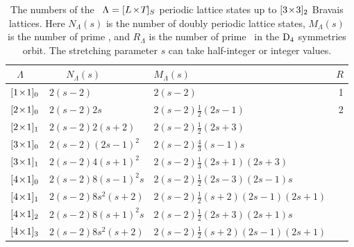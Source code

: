 
\begin{table}
\caption[]{\label{tab:LxTs}     \small
The numbers of the \catlatt\ $\Lambda={[{L_{}}\!\times\!{T_{}}]_{S_{}}}$ periodic lattice states
up to ${[3\!\times\!3]_{2}}$ Bravais lattices. Here
$N_\Lambda(s)$ is the number of doubly periodic
lattice states,
$M_\Lambda(s)$ is the number of prime \twots,
and $R_{\Lambda}$ is the number
of prime \twots\ in the $\textrm{D}_{4}$ symmetries orbit.
The stretching parameter ${s}$ can take half-integer or integer
values.
}
\begin{center}
{\small
\begin{tabular}{lllr}
\\[-16pt]
$~~~\Lambda$
                         & ~~~$N_\Lambda(s)$ & $M_\Lambda(s)$
                                                 &$R$  \\
\hline
${[1\!\times\!1]_{0}}$    &   $2({s}-2)$ & $2({s}-2)$ & 1 \\
${[2\!\times\!1]_{0}}$    &   $2({s}-2)2s$ & $2({s}-2)\frac{1}{2}(2{s}-1)$   & 2 \\
${[2\!\times\!1]_{1}}$  &   $2({s}-2)2({s}+2)$ & $2({s}-2)\frac{1}{2}(2{s}+3)$  & \\
${[3\!\times\!1]_{0}}$    &   $2({s}-2)(2{s}-1)^2$ & $2({s}-2)\frac{4}{3}({s}-1){s}$ &  \\
${[3\!\times\!1]_{1}}$  &   $2({s}-2)4({s}+1)^2$ & $2({s}-2)\frac{1}{3}(2{s}+1)(2{s}+3)$ & \\
${[4\!\times\!1]_{0}}$    &   $2({s}-2)8({s}-1)^2{s}$ & $2({s}-2)\frac{1}{2}(2{s}-3)(2{s}-1)s$ & \\
${[4\!\times\!1]_{1}}$  &   $2({s}-2)8s^2({s}+2)$ & $2({s}-2)\frac{1}{2}({s}+2)(2{s}-1)(2{s}+1)$ & \\
${[4\!\times\!1]_{2}}$  &   $2({s}-2)8({s}+1)^2{s}$ & $2({s}-2)\frac{1}{2}(2{s}+3)(2{s}+1)s$     & \\
${[4\!\times\!1]_{3}}$  &   $2({s}-2)8s^2({s}+2)$ & $2({s}-2)\frac{1}{2}({s}+2)(2{s}-1)(2{s}+1)$ &  \\

\end{tabular}}
\end{center}
\end{table}
